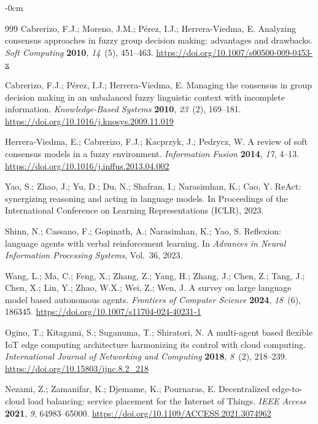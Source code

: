 \documentclass[smartcities,article,submit,moreauthors]{Definitions/mdpi}
\begin{document}
\begin{adjustwidth}{-\extralength}{0cm}
\begin{thebibliography}{999}
Cabrerizo, F.J.; Moreno, J.M.; P\'erez, I.J.; Herrera-Viedma, E. Analyzing
consensus approaches in fuzzy group decision making: advantages and drawbacks.
\emph{Soft Computing} \textbf{2010}, \emph{14}~(5), 451--463.
\url{https://doi.org/10.1007/s00500-009-0453-x}

Cabrerizo, F.J.; P\'erez, I.J.; Herrera-Viedma, E. Managing the consensus in
group decision making in an unbalanced fuzzy linguistic context with
incomplete information. \emph{Knowledge-Based Systems} \textbf{2010},
\emph{23}~(2), 169--181.
\url{https://doi.org/10.1016/j.knosys.2009.11.019}

Herrera-Viedma, E.; Cabrerizo, F.J.; Kacprzyk, J.; Pedrycz, W. A review of
soft consensus models in a fuzzy environment. \emph{Information Fusion}
\textbf{2014}, \emph{17}, 4--13.
\url{https://doi.org/10.1016/j.inffus.2013.04.002}

Yao, S.; Zhao, J.; Yu, D.; Du, N.; Shafran, I.; Narasimhan, K.; Cao, Y. ReAct:
synergizing reasoning and acting in language models. In Proceedings of the
International Conference on Learning Representations (ICLR), 2023.

Shinn, N.; Cassano, F.; Gopinath, A.; Narasimhan, K.; Yao, S. Reflexion:
language agents with verbal reinforcement learning. In \emph{Advances in
Neural Information Processing Systems}, Vol.~36, 2023.

Wang, L.; Ma, C.; Feng, X.; Zhang, Z.; Yang, H.; Zhang, J.; Chen, Z.; Tang,
J.; Chen, X.; Lin, Y.; Zhao, W.X.; Wei, Z.; Wen, J. A survey on large language
model based autonomous agents. \emph{Frontiers of Computer Science}
\textbf{2024}, \emph{18}~(6), 186345.
\url{https://doi.org/10.1007/s11704-024-40231-1}


Ogino, T.; Kitagami, S.; Suganuma, T.; Shiratori, N. A multi-agent based
flexible IoT edge computing architecture harmonizing its control with cloud
computing. \emph{International Journal of Networking and Computing}
\textbf{2018}, \emph{8}~(2), 218--239.
\url{https://doi.org/10.15803/ijnc.8.2_218}

Nezami, Z.; Zamanifar, K.; Djemame, K.; Pournaras, E. Decentralized
edge-to-cloud load balancing: service placement for the Internet of Things.
\emph{IEEE Access} \textbf{2021}, \emph{9}, 64983--65000.
\url{https://doi.org/10.1109/ACCESS.2021.3074962}


\end{thebibliography}
\end{adjustwidth}
\end{document}
